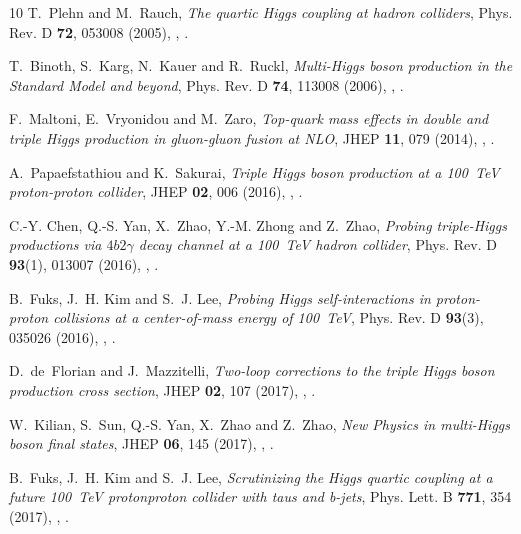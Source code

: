 \documentclass{SciPost}
\begin{document}
\begin{thebibliography}{10}
T.~Plehn and M.~Rauch,
\newblock \emph{{The quartic Higgs coupling at hadron colliders}},
\newblock Phys. Rev. D \textbf{72}, 053008 (2005),
\newblock {},
\newblock {}.

T.~Binoth, S.~Karg, N.~Kauer and R.~Ruckl,
\newblock \emph{{Multi-Higgs boson production in the Standard Model and beyond}},
\newblock Phys. Rev. D \textbf{74}, 113008 (2006),
\newblock {},
\newblock {}.

F.~Maltoni, E.~Vryonidou and M.~Zaro,
\newblock \emph{{Top-quark mass effects in double and triple Higgs production in gluon-gluon fusion at NLO}},
\newblock JHEP \textbf{11}, 079 (2014),
\newblock {},
\newblock {}.

A.~Papaefstathiou and K.~Sakurai,
\newblock \emph{{Triple Higgs boson production at a 100~TeV proton-proton collider}},
\newblock JHEP \textbf{02}, 006 (2016),
\newblock {},
\newblock {}.

C.-Y. Chen, Q.-S. Yan, X.~Zhao, Y.-M. Zhong and Z.~Zhao,
\newblock \emph{{Probing triple-Higgs productions via $4b2\gamma$ decay channel at a 100~TeV hadron collider}},
\newblock Phys. Rev. D \textbf{93}(1), 013007 (2016),
\newblock {},
\newblock {}.

B.~Fuks, J.~H. Kim and S.~J. Lee,
\newblock \emph{{Probing Higgs self-interactions in proton-proton collisions at a center-of-mass energy of 100~TeV}},
\newblock Phys. Rev. D \textbf{93}(3), 035026 (2016),
\newblock {},
\newblock {}.

D.~de~Florian and J.~Mazzitelli,
\newblock \emph{{Two-loop corrections to the triple Higgs boson production cross section}},
\newblock JHEP \textbf{02}, 107 (2017),
\newblock {},
\newblock {}.

W.~Kilian, S.~Sun, Q.-S. Yan, X.~Zhao and Z.~Zhao,
\newblock \emph{{New Physics in multi-Higgs boson final states}},
\newblock JHEP \textbf{06}, 145 (2017),
\newblock {},
\newblock {}.

B.~Fuks, J.~H. Kim and S.~J. Lee,
\newblock \emph{{Scrutinizing the Higgs quartic coupling at a future 100~TeV proton\textendash{}proton collider with taus and b-jets}},
\newblock Phys. Lett. B \textbf{771}, 354 (2017),
\newblock {},
\newblock {}.


\end{thebibliography}
\end{document}
